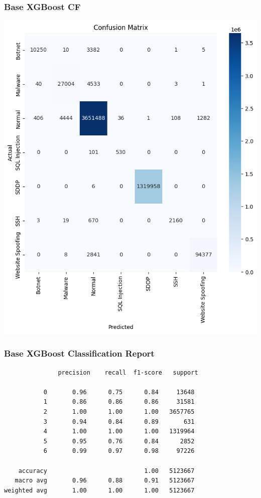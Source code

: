 \begin{appendices}
\subsubsection{Base XGBoost CF}
\includegraphics[width=\textwidth]{Appendices/Base_XGB_CF.png}
\newpage

\subsubsection{Base XGBoost Classification Report}
\begin{lstlisting}
               precision    recall  f1-score   support

           0       0.96      0.75      0.84     13648
           1       0.86      0.86      0.86     31581
           2       1.00      1.00      1.00   3657765
           3       0.94      0.84      0.89       631
           4       1.00      1.00      1.00   1319964
           5       0.95      0.76      0.84      2852
           6       0.99      0.97      0.98     97226

    accuracy                           1.00   5123667
   macro avg       0.96      0.88      0.91   5123667
weighted avg       1.00      1.00      1.00   5123667
\end{lstlisting}


\end{appendices}
